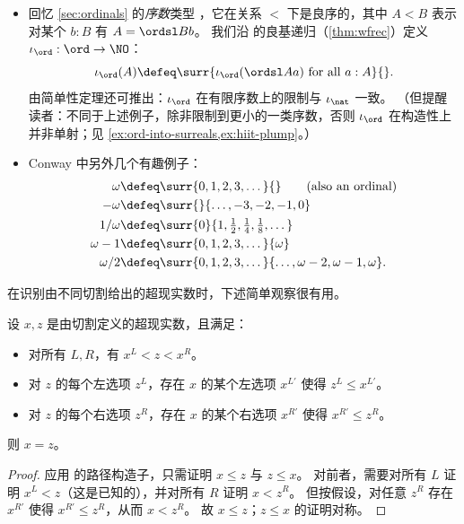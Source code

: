 \begin{itemize}
  这将由简单性定理（\cref{thm:NO-simplicity}）推出。
\item 回忆 \cref{sec:ordinals} 的\emph{序数}类型 \ord，它在关系 $<$ 下是良序的，其中 $A<B$ 表示对某个 $b:B$ 有 $A = \ordsl B b$。
  我们沿 \ord 的良基递归（\cref{thm:wfrec}）定义 $\iota_{\ord}:\ord\to\NO$\label{ord-into-surreals}：
  \begin{equation*}
    \iota_{\ord}(A) \defeq
    \surr{\iota_\ord(\ordsl A a) \text{ for all } a:A}{}.
  \end{equation*}
  由简单性定理还可推出：$\iota_\ord$ 在有限序数上的限制与 $\iota_\nat$ 一致。
  （但提醒读者：不同于上述例子，除非限制到更小的一类序数，否则 $\iota_\ord$ 在构造性上并非单射；见 \cref{ex:ord-into-surreals,ex:hiit-plump}。）
\item Conway 中另外几个有趣例子：
  \begin{align*}
    \omega &\defeq \surr{0,1,2,3,\dots}{} \qquad\text{(also an ordinal)}\\
    -\omega &\defeq \surr{}{\dots,-3,-2,-1,0}\\
    1/\omega &\defeq \textstyle\surr{0}{1,\frac12,\frac14,\frac18,\dots}\\
    \omega-1 &\defeq \surr{0,1,2,3,\dots}{\omega}\\
    \omega/2 &\defeq \surr{0,1,2,3,\dots}{\dots,\omega-2,\omega-1,\omega}.
  \end{align*}
\end{itemize}

在识别由不同切割给出的超现实数时，下述简单观察很有用。

\begin{thm}\label{thm:NO-simplicity}
  设 $x,z$ 是由切割定义的超现实数，且满足：
  \begin{itemize}
  \item 对所有 $L,R$，有 $x^L < z < x^R$。
  \item 对 $z$ 的每个左选项 $z^L$，存在 $x$ 的某个左选项 $x^{L'}$ 使得 $z^L\le x^{L'}$。
  \item 对 $z$ 的每个右选项 $z^R$，存在 $x$ 的某个右选项 $x^{R'}$ 使得 $x^{R'}\le z^R$。
  \end{itemize}
  则 $x=z$。
\end{thm}
\begin{proof}
  应用 \NO 的路径构造子，只需证明 $x\le z$ 与 $z\le x$。
  对前者，需要对所有 $L$ 证明 $x^L<z$（这是已知的），并对所有 $R$ 证明 $x<z^R$。
  但按假设，对任意 $z^R$ 存在 $x^{R'}$ 使得 $x^{R'}\le z^R$，从而 $x<z^R$。
  故 $x\le z$；$z\le x$ 的证明对称。
\end{proof}

